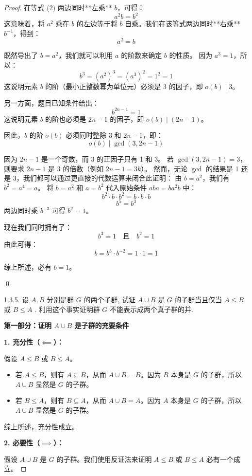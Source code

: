 \documentclass[]{article}
\begin{document}
\begin{proof}
在等式 (2) 两边同时**左乘** $b$，可得：
\[ a^2b = b^2 \]
这意味着，将 $a^2$ 乘在 $b$ 的左边等于将 $b$ 自乘。我们在该等式两边同时**右乘** $b^{-1}$，得到：
\[ a^2 = b \]

既然导出了 $b = a^2$，我们就可以利用 $a$ 的阶数来确定 $b$ 的性质。
因为 $a^3 = 1$，所以：
\[ b^3 = (a^2)^3 = (a^3)^2 = 1^2 = 1 \]
这说明元素 $b$ 的阶（最小正整数幂为单位元）必须是 3 的因子，即 $o(b) \mid 3$。

另一方面，题目已知条件给出：
\[ b^{2n-1} = 1 \]
这说明元素 $b$ 的阶也必须是 $2n-1$ 的因子，即 $o(b) \mid (2n-1)$。

因此，$b$ 的阶 $o(b)$ 必须同时整除 3 和 $2n-1$，即：
\[ o(b) \mid \gcd(3, 2n-1) \]

因为 $2n-1$ 是一个奇数，而 3 的正因子只有 1 和 3。
若 $\gcd(3, 2n-1) = 3$，则要求 $2n-1$ 是 3 的倍数（例如 $2n-1 = 3k$）。
然而，无论 $\gcd$ 的结果是 1 还是 3，我们都可以通过更直接的代数运算来闭合此证明：
由 $b = a^2$，我们有 $b^2 = a^4 = a$。
将 $b = a^2$ 和 $a = b^2$ 代入原始条件 $aba = ba^2b$ 中：
\[ b^2 \cdot b \cdot b^2 = b \cdot b \cdot b \]
\[ b^5 = b^3 \]
两边同时乘 $b^{-3}$ 可得 $b^2 = 1$。

现在我们同时拥有了：
\[ b^3 = 1 \quad \text{且} \quad b^2 = 1 \]
由此可得：
\[ b = b^3 \cdot b^{-2} = 1 \cdot 1 = 1 \]

综上所述，必有 $b = 1$。

\qed

1.3.5. 设 $A, B$ 分别是群 $G$ 的两个子群, 试证 $A \cup B$ 是 $G$ 的子群当且仅当 $A \leqslant B$ 或 $B \leqslant A$ . 利用这个事实证明群 $G$ 不能表示成两个真子群的并. 

\bigskip
\noindent \textbf{第一部分：证明 $A \cup B$ 是子群的充要条件}

\medskip
\noindent \textbf{1. 充分性（$\impliedby$）：}

假设 $A \leqslant B$ 或 $B \leqslant A$。
\begin{itemize}
	\item 若 $A \leqslant B$，则有 $A \subseteq B$，从而 $A \cup B = B$。因为 $B$ 本身是 $G$ 的子群，所以 $A \cup B$ 显然是 $G$ 的子群。
	\item 若 $B \leqslant A$，则有 $B \subseteq A$，从而 $A \cup B = A$。因为 $A$ 本身是 $G$ 的子群，所以 $A \cup B$ 显然是 $G$ 的子群。
\end{itemize}
综上所述，充分性成立。

\medskip
\noindent \textbf{2. 必要性（$\implies$）：}

假设 $A \cup B$ 是 $G$ 的子群。我们使用反证法来证明 $A \leqslant B$ 或 $B \leqslant A$ 必有一个成立。


\end{proof}
\end{document}

